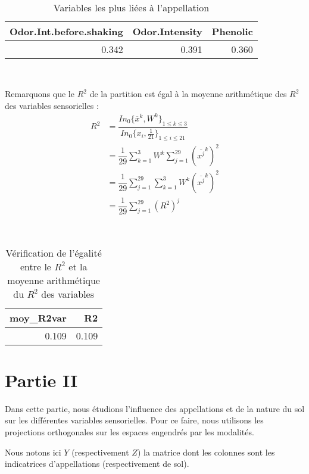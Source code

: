 \documentclass[a4paper,10pt]{article}
\newcommand{\vs}[1]{\vspace{#1cm}}
\newcommand{\dsum}[2]{\displaystyle\sum_{#1}^{#2}}
\begin{document}
\
	
\begin{table}[ht]
	\centering
	\begin{tabular}{rrr}
		\hline
		Odor.Int.before.shaking & Odor.Intensity & Phenolic \\ 
		\hline
		0.342 & 0.391 & 0.360 \\ 
		\hline
	\end{tabular}
	\caption{Variables les plus liées à l'appellation} 
\end{table}
	
\
	
Remarquons que le $R^2$ de la partition est égal à la moyenne arithmétique des $R^2$ des variables sensorielles : 
$$\begin{array}{ll}
	R^2
	&=\dfrac{In_{0}\{\overline x^k,W^k\}_{1\leqslant k\leqslant 3}}{In_0\{x_i,\frac 1{21}\}_{1\leqslant i\leqslant 21}}\\
	&= \dfrac 1{29}\dsum{k=1}3W^k\dsum{j=1}{29}(\overline{x^j}^k)^2\\
	&=\dfrac 1{29}\dsum{j=1}{29}\dsum{k=1}3W^k(\overline{x^j}^k)^2\\
	&=\dfrac 1{29}\dsum{j=1}{29}(R^2)^j
\end{array}$$
	
\
	
\begin{table}[!ht]
	\centering
	\begin{tabular}{rr}
		\hline
		moy\_R2var & R2 \\ 
		\hline
		0.109 & 0.109 \\ 
		\hline
	\end{tabular}
	\caption{Vérification de l'égalité entre le $R^2$ et la moyenne arithmétique du $R^2$ des variables} 
\end{table}
	
\vs1
	
\section{Partie II}
	
Dans cette partie, nous étudions l'influence des appellations et de la nature du sol sur les différentes variables sensorielles. Pour ce faire, nous utilisons les projections orthogonales sur les espaces engendrés par les modalités.
	
Nous notons ici $Y$ (respectivement $Z$) la matrice dont les colonnes sont les indicatrices d'appellations (respectivement de sol).
	
\
	
\end{document}
